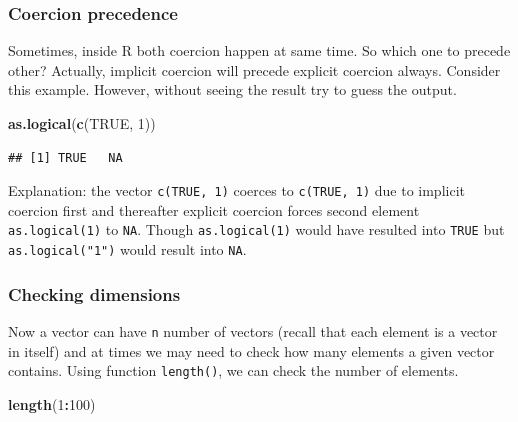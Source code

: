 \documentclass[
]{book}
\newenvironment{Shaded}{\begin{snugshade}}{\end{snugshade}}
\newcommand{\DecValTok}[1]{\textcolor[rgb]{0.00,0.00,0.81}{#1}}
\newcommand{\FunctionTok}[1]{\textcolor[rgb]{0.13,0.29,0.53}{\textbf{#1}}}
\newcommand{\NormalTok}[1]{#1}
\newcommand{\SpecialCharTok}[1]{\textcolor[rgb]{0.81,0.36,0.00}{\textbf{#1}}}
\newcommand{\StringTok}[1]{\textcolor[rgb]{0.31,0.60,0.02}{#1}}
\begin{document}
\hypertarget{coercion-precedence}{%
\subsubsection{Coercion precedence}\label{coercion-precedence}}

Sometimes, inside R both coercion happen at same time. So which one to precede other? Actually, implicit coercion will precede explicit coercion always. Consider this example. However, without seeing the result try to guess the output.

\begin{Shaded}
\begin{Highlighting}[]
\FunctionTok{as.logical}\NormalTok{(}\FunctionTok{c}\NormalTok{(}\StringTok{\textquotesingle{}TRUE\textquotesingle{}}\NormalTok{, }\DecValTok{1}\NormalTok{))}
\end{Highlighting}
\end{Shaded}

\begin{verbatim}
## [1] TRUE   NA
\end{verbatim}

Explanation: the vector \texttt{c(\textquotesingle{}TRUE\textquotesingle{},\ 1)} coerces to \texttt{c(\textquotesingle{}TRUE\textquotesingle{},\ \textquotesingle{}1\textquotesingle{})} due to implicit coercion first and thereafter explicit coercion forces second element \texttt{as.logical(\textquotesingle{}1\textquotesingle{})} to \texttt{NA}. Though \texttt{as.logical(1)} would have resulted into \texttt{TRUE} but \texttt{as.logical("1")} would result into \texttt{NA}.

\hypertarget{checking-dimensions}{%
\subsubsection*{Checking dimensions}\label{checking-dimensions}}

Now a vector can have \texttt{n} number of vectors (recall that each element is a vector in itself) and at times we may need to check how many elements a given vector contains. Using function \texttt{length()}, we can check the number of elements.

\begin{Shaded}
\begin{Highlighting}[]
\FunctionTok{length}\NormalTok{(}\DecValTok{1}\SpecialCharTok{:}\DecValTok{100}\NormalTok{)}
\end{Highlighting}
\end{Shaded}
\end{document}
